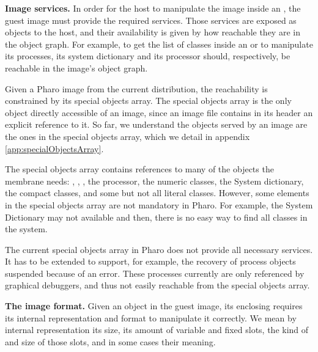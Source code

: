 \begin{description}
	\item \textbf{Image services.} In order for the host to manipulate the image inside an \objectspace, the guest image must provide the required services. Those services are exposed as objects to the host, and their availability is given by how reachable they are in the object graph. For example, to get the list of classes inside an \objectspace or to manipulate its processes, its system dictionary and its processor should, respectively, be reachable in the image's object graph.
		
	Given a Pharo image from the current distribution, the reachability is constrained by its special objects array.
	The special objects array is the only object directly accessible of an image, since an image file contains in its header an explicit reference to it. So far, we understand the objects served by an image are the ones in the special objects array, which we detail in appendix \ref{app:specialObjectsArray}.
	
	The special objects array contains references to many of the objects the membrane needs: , , , the processor, the numeric classes, the System dictionary, the compact classes, and some but not all literal classes.
	However, some elements in the special objects array are not mandatory in Pharo. For example, the System Dictionary may not available and then, there is no easy way to find all classes in the system. %
	
	The current special objects array in Pharo does not provide all necessary services. It has to be extended to support, for example, the recovery of process objects suspended because of an error. These processes currently are only referenced by graphical debuggers, and thus not easily reachable from the special objects array. 

		 
	\item \textbf{The image format.} Given an object in the guest image, its enclosing \objectspace requires its internal representation and format to manipulate it correctly. We mean by internal representation its size, its amount of variable and fixed slots, the kind of and size of those slots, and in some cases their meaning.
	

\end{description}
